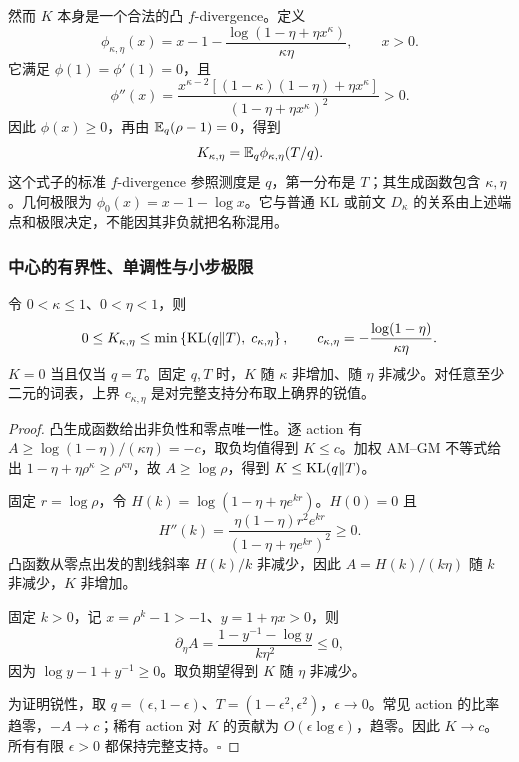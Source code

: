 然而 $K$ 本身是一个合法的凸 $f$-divergence。定义
\begin{equation}
 \phi_{\kappa,\eta}(x)=x-1-
 \frac{\log(1-\eta+\eta x^\kappa)}{\kappa\eta},\qquad x>0.
 \label{eq:center-convex-generator}
\end{equation}
它满足 $\phi(1)=\phi'(1)=0$，且
\begin{equation}
 \phi''(x)=
 \frac{x^{\kappa-2}[(1-\kappa)(1-\eta)+\eta x^\kappa]}
 {(1-\eta+\eta x^\kappa)^2}>0.
\end{equation}
因此 $\phi(x)\ge0$，再由 $\mathbb E_q(\rho-1)=0$，得到
\begin{equation}
 K_{\kappa,\eta}=\mathbb E_q\phi_{\kappa,\eta}(T/q).
\end{equation}
这个式子的标准 $f$-divergence 参照测度是 $q$，第一分布是 $T$；其生成函数包含 $\kappa,\eta$。几何极限为 $\phi_0(x)=x-1-\log x$。它与普通 KL 或前文 $D_\kappa$ 的关系由上述端点和极限决定，不能因其非负就把名称混用。

\subsubsection{中心的有界性、单调性与小步极限}

\begin{theorem}[教师中心的分布无关界]
\label{thm:center-bounds-monotonicity}
令 $0<\kappa\le1$、$0<\eta<1$，则
\begin{equation}
 0\le K_{\kappa,\eta}
 \le\min\left\{\operatorname{KL}(q\Vert T),\;
 c_{\kappa,\eta}\right\},\qquad
 c_{\kappa,\eta}=-\frac{\log(1-\eta)}{\kappa\eta}.
 \label{eq:center-uniform-cap}
\end{equation}
$K=0$ 当且仅当 $q=T$。固定 $q,T$ 时，$K$ 随 $\kappa$ 非增加、随 $\eta$ 非减少。对任意至少二元的词表，上界 $c_{\kappa,\eta}$ 是对完整支持分布取上确界的锐值。
\end{theorem}

\begin{proof}
凸生成函数给出非负性和零点唯一性。逐 action 有 $A\ge\log(1-\eta)/(\kappa\eta)=-c$，取负均值得到 $K\le c$。加权 AM--GM 不等式给出 $1-\eta+\eta\rho^\kappa\ge\rho^{\kappa\eta}$，故 $A\ge\log\rho$，得到 $K\le\operatorname{KL}(q\Vert T)$。

固定 $r=\log\rho$，令 $H(k)=\log(1-\eta+\eta e^{kr})$。$H(0)=0$ 且
\begin{equation}
 H''(k)=\frac{\eta(1-\eta)r^2e^{kr}}{(1-\eta+\eta e^{kr})^2}\ge0.
\end{equation}
凸函数从零点出发的割线斜率 $H(k)/k$ 非减少，因此 $A=H(k)/(k\eta)$ 随 $k$ 非减少，$K$ 非增加。

固定 $k>0$，记 $x=\rho^k-1>-1$、$y=1+\eta x>0$，则
\begin{equation}
 \partial_\eta A=\frac{1-y^{-1}-\log y}{k\eta^2}\le0,
\end{equation}
因为 $\log y-1+y^{-1}\ge0$。取负期望得到 $K$ 随 $\eta$ 非减少。

为证明锐性，取 $q=(\epsilon,1-\epsilon)$、$T=(1-\epsilon^2,\epsilon^2)$，$\epsilon\to0$。常见 action 的比率趋零，$-A\to c$；稀有 action 对 $K$ 的贡献为 $O(\epsilon\log\epsilon)$，趋零。因此 $K\to c$。所有有限 $\epsilon>0$ 都保持完整支持。\hfill$\square$
\end{proof}

